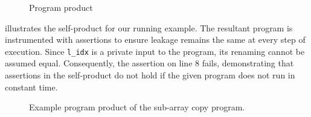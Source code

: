 \begin{figure}[h]
    \centering
    \label{fig:fig_7}
    \label{fig:fig_8}
    \caption{Program product}
    \label{fig:rules}
\end{figure}

 illustrates the self-product for our running example. 
The resultant program is instrumented with assertions to ensure leakage remains the same at
every step of execution.
Since \texttt{l\_idx} is a private input to the program, its renaming cannot be assumed equal.
Consequently, the assertion on line $8$ fails, demonstrating that assertions in the self-product do not hold if the given program does not run in constant time.

\begin{figure}[h]
    \centering\resizebox{1.2\columnwidth}{!}{}
    \caption{Example program product of the sub-array copy program.}
    \label{fig:example_prod}
\end{figure}